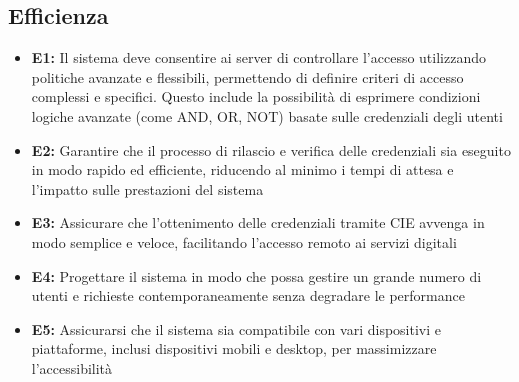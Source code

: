     \subsection{Efficienza}
        \begin{itemize}
            \item \textbf{E1:} Il sistema deve consentire ai server di controllare l'accesso utilizzando politiche avanzate e flessibili, permettendo di definire criteri di accesso complessi e specifici. Questo include la possibilità di esprimere condizioni logiche avanzate (come AND, OR, NOT) basate sulle credenziali degli utenti
            
            \item \textbf{E2:} Garantire che il processo di rilascio e verifica delle credenziali sia eseguito in modo rapido ed efficiente, riducendo al minimo i tempi di attesa e l'impatto sulle prestazioni del sistema
            
            \item \textbf{E3:} Assicurare che l'ottenimento delle credenziali tramite CIE avvenga in modo semplice e veloce, facilitando l'accesso remoto ai servizi digitali

            \item \textbf{E4:} Progettare il sistema in modo che possa gestire un grande numero di utenti e richieste contemporaneamente senza degradare le performance

            \item \textbf{E5:} Assicurarsi che il sistema sia compatibile con vari dispositivi e piattaforme, inclusi dispositivi mobili e desktop, per massimizzare l'accessibilità
        \end{itemize}